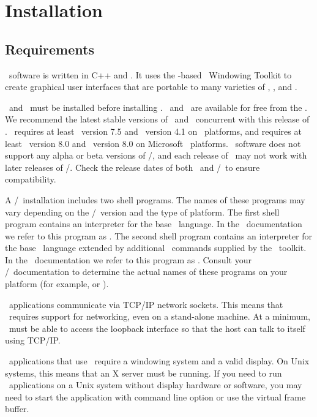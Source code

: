 \section{Installation}\label{sec:install}

\subsection{Requirements}\label{sec:install.requirements}
\OOMMF\ software is written in C++ and \Tcl.  It uses the \Tcl-based
\Tk\ Windowing Toolkit to create graphical user interfaces that are
portable to many varieties of \Unix, \Windows, and \MacOSX.  

\Tcl\ and \Tk\ must be installed before installing \OOMMF.  
\Tcl\ and \Tk\ are available for free from the
.
We recommend the latest stable 
versions of \Tcl\ and \Tk\ concurrent with this release of \OOMMF.
\OOMMF\ requires
at least \Tcl\ version 7.5 and \Tk\ version 4.1 
on \Unix\ platforms, and requires at least \Tcl\ version 8.0 and 
\Tk\ version 8.0 on Microsoft \Windows\ platforms.  \OOMMF\ software 
does not support any alpha or beta versions of \Tcl/\Tk, and 
each release of \OOMMF\ may not work with later releases of
\Tcl/\Tk.  Check the release dates of both \OOMMF\ and
\Tcl/\Tk\ to ensure compatibility.

A \Tcl/\Tk\ installation includes two shell programs.  The names of 
these programs may vary depending on the \Tcl/\Tk\ version and the 
type of platform.  The first shell program contains an interpreter 
for the base \Tcl\ language.  In the \OOMMF\ documentation we refer 
to this program as .  
The second shell program contains 
an interpreter for the base \Tcl\ language extended by additional
\Tcl\ commands supplied by the \Tk\ toolkit.  In the 
\OOMMF\ documentation we refer to this program as 
.  
Consult your \Tcl/\Tk\ documentation to determine 
the actual names of these programs on your platform (for example, 
 or ).

\OOMMF\ applications communicate via TCP/IP network sockets.
This means that \OOMMF\ requires
support for networking, even 
on a stand-alone machine.  At a minimum, \OOMMF\ must be able to 
access the loopback interface so that the host can talk to 
itself using TCP/IP.

\OOMMF\ applications that use \Tk\ require a windowing system and
a valid display.  On Unix systems, this means that an X server must
be running.  If you need to run \OOMMF\ applications on a Unix system
without display hardware or software, you may need to start the 
application with command line option 
or use the
virtual frame buffer.

